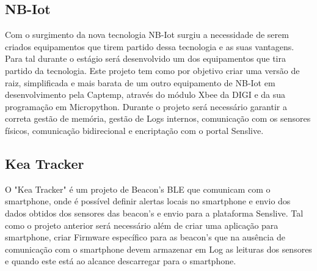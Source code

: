 \subsection{NB-Iot}
Com o surgimento da nova tecnologia NB-Iot surgiu a necessidade de serem criados equipamentos que tirem partido dessa tecnologia e as suas vantagens. Para tal durante o estágio será desenvolvido um dos equipamentos que tira partido da tecnologia. Este projeto tem como por objetivo criar uma versão de raiz, simplificada e mais barata de um outro equipamento de NB-Iot em desenvolvimento pela Captemp, através do módulo Xbee da DIGI e da sua programação em Micropython. Durante o projeto será necessário garantir a correta gestão de memória, gestão de Logs internos, comunicação com os sensores físicos, comunicação bidirecional e encriptação com o portal Senslive.
\subsection{Kea Tracker}
O "Kea Tracker" é um projeto de Beacon’s BLE que comunicam com o smartphone, onde é possível definir alertas locais no smartphone e envio dos dados obtidos dos sensores das beacon’s e envio para a plataforma Senslive.
Tal como o projeto anterior será necessário além de criar uma aplicação para smartphone, criar Firmware específico para as beacon’s que na ausência de comunicação com o smartphone devem armazenar em Log as leituras dos sensores e quando este está ao alcance descarregar para o smartphone.

